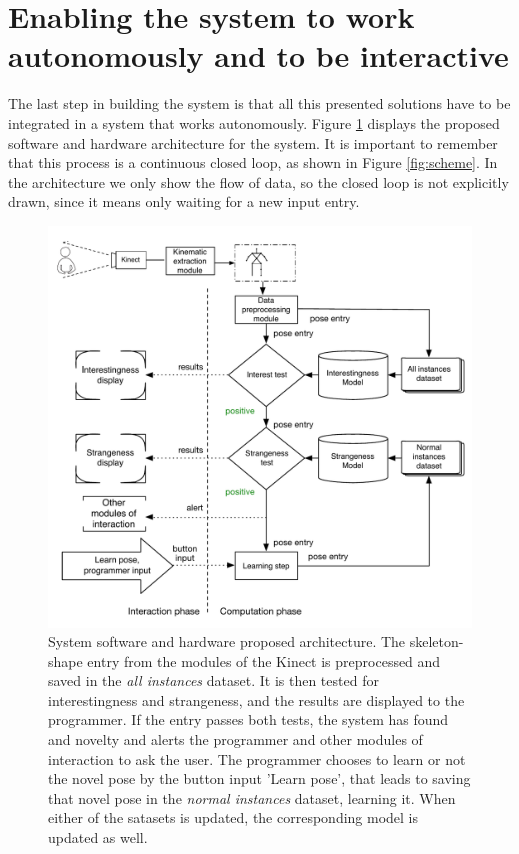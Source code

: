 \section{Enabling the system to work autonomously and to be interactive}

The last step in building the system is that all this presented solutions have to be integrated in a system that works autonomously. Figure \ref{arch} displays the proposed software and hardware architecture for the system. It is important to remember that this process is a continuous closed loop, as shown in Figure \ref{fig:scheme}. In the architecture we only show the flow of data, so the closed loop is not explicitly drawn, since it means only waiting for a new input entry.

\begin{figure}[h]
\includegraphics[width=14cm]{Figures/architecture}
\centering
\caption[System software and hardware proposed architecture]{System software and hardware proposed architecture\label{arch}. The skeleton-shape entry from the modules of the Kinect is preprocessed and saved in the \emph{all instances} dataset. It is then tested for interestingness and strangeness, and the results are displayed to the programmer. If the entry passes both tests, the system has found and novelty and alerts the programmer and other modules of interaction to ask the user. The programmer chooses to learn or not the novel pose by the button input 'Learn pose', that leads to saving that novel pose in the \emph{normal instances} dataset, learning it. When either of the satasets is updated, the corresponding model is updated as well.}
\end{figure}

